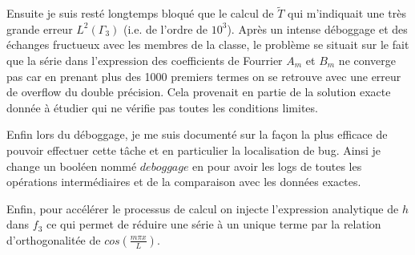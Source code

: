 \documentclass{article}
\begin{document}
Ensuite je suis resté longtemps bloqué que le calcul de $\tilde{T}$ qui m'indiquait une très grande erreur $L^2(\Gamma_3)$ (i.e. de l'ordre de $10^3$). Après un intense déboggage et des échanges fructueux avec les membres de la classe, le problème se situait sur le fait que la série dans l'expression des coefficients de Fourrier $A_m$ et $B_m$ ne converge pas car en prenant plus des 1000 premiers termes on se retrouve avec une erreur de overflow du double précision. Cela provenait en partie de la solution exacte donnée à étudier qui ne vérifie pas toutes les conditions limites. 


Enfin lors du déboggage, je me suis documenté sur la façon la plus efficace de pouvoir effectuer cette tâche et en particulier la localisation de bug. Ainsi je change un booléen nommé $deboggage$ en pour avoir les logs de toutes les opérations intermédiaires et de la comparaison avec les données exactes.


Enfin, pour accélérer le processus de calcul on injecte l'expression analytique de $h$ dans $f_3$ ce qui permet de réduire une série à un unique terme par la relation d'orthogonalitée de $cos(\frac{m\pi x}{L})$.
\end{document}
